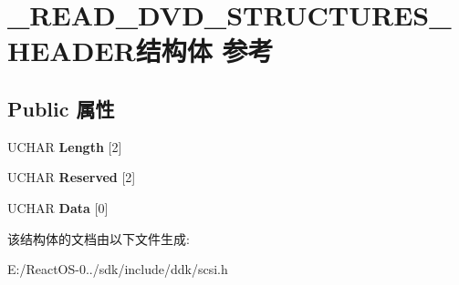 \hypertarget{struct___r_e_a_d___d_v_d___s_t_r_u_c_t_u_r_e_s___h_e_a_d_e_r}{}\section{\+\_\+\+R\+E\+A\+D\+\_\+\+D\+V\+D\+\_\+\+S\+T\+R\+U\+C\+T\+U\+R\+E\+S\+\_\+\+H\+E\+A\+D\+E\+R结构体 参考}
\label{struct___r_e_a_d___d_v_d___s_t_r_u_c_t_u_r_e_s___h_e_a_d_e_r}
\subsection*{Public 属性}
\begin{DoxyCompactItemize}
\item 
\mbox{\label{struct___r_e_a_d___d_v_d___s_t_r_u_c_t_u_r_e_s___h_e_a_d_e_r_ab3263242d5a631ba83f027c1c98eada1}} 
U\+C\+H\+AR {\bfseries Length} \mbox{[}2\mbox{]}
\item 
\mbox{\label{struct___r_e_a_d___d_v_d___s_t_r_u_c_t_u_r_e_s___h_e_a_d_e_r_a714651726f600ec038f6f35a69ba06d4}} 
U\+C\+H\+AR {\bfseries Reserved} \mbox{[}2\mbox{]}
\item 
\mbox{\label{struct___r_e_a_d___d_v_d___s_t_r_u_c_t_u_r_e_s___h_e_a_d_e_r_a513f717313ed49106ecd25099234b4e7}} 
U\+C\+H\+AR {\bfseries Data} \mbox{[}0\mbox{]}
\end{DoxyCompactItemize}


该结构体的文档由以下文件生成\+:\begin{DoxyCompactItemize}
\item 
E\+:/\+React\+O\+S-\/0../sdk/include/ddk/scsi.\+h\end{DoxyCompactItemize}
